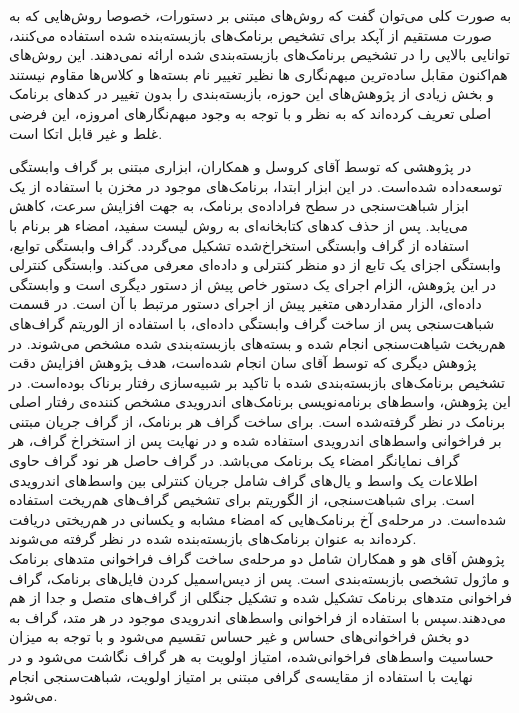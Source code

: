 به صورت کلی می‌توان گفت که روش‌های مبتنی بر دستورات، خصوصا روش‌هایی که به صورت مستقیم از آپکد برای تشخیص برنامک‌های بازبسته‌بنده شده استفاده می‌کنند، توانایی بالایی را در تشخیص برنامک‌های بازبسته‌بندی شده ارائه‌ نمی‌دهند. این روش‌های هم‌اکنون مقابل ساده‌ترین مبهم‌نگاری ها نظیر تغییر نام بسته‌ها و کلاس‌ها مقاوم نیستند و بخش زیادی از پژوهش‌های این حوزه، بازبسته‌بندی را بدون تغییر در کد‌های برنامک اصلی تعریف کرده‌اند که به نظر و با توجه به وجود مبهم‌نگارهای امروزه، این فرضی غلط و غیر قابل اتکا است.

در پژوهشی که توسط آقای کروسل و همکاران، ابزاری مبتنی بر گراف وابستگی توسعه‌داده‌ شده‌است. در این ابزار ابتدا، برنامک‌های موجود در مخزن با استفاده از یک ابزار شباهت‌سنجی در سطح فراداده‌ی برنامک، به جهت افزایش سرعت، کاهش می‌یابد. پس از حذف کد‌های کتابخانه‌ای به روش لیست سفید، امضاء هر برنام با استفاده از گراف وابستگی استخراخ‌شده تشکیل می‌گردد. گراف وابستگی توابع، وابستگی اجزای یک تابع از دو منظر کنترلی و داده‌ای معرفی می‌کند. وابستگی کنترلی در این پژوهش، الزام اجرای یک دستور خاص پیش از دستور دیگری است و وابستگی داده‌ای، الزار مقداردهی متغیر پیش از اجرای دستور مرتبط با آن است. در قسمت شباهت‌سنجی پس از ساخت گراف وابستگی داده‌ای، با استفاده از الوریتم گراف‌های هم‌ریخت  شیاهت‌سنجی انجام شده و بسته‌های بازبسته‌بندی شده مشخص می‌شوند. در پژوهش دیگری که توسط آقای سان انجام‌ شده‌است، هدف پژوهش افزایش دقت تشخیص برنامک‌های بازبسته‌بندی شده با تاکید بر شبیه‌سازی رفتار برناک بوده‌است. در این پژوهش، واسط‌های برنامه‌نویسی برنامک‌های اندرویدی مشخص کننده‌ی رفتار اصلی برنامک در نظر گرفته‌شده است. برای ساخت گراف هر برنامک، از گراف جریان مبتنی بر فراخوانی واسط‌های اندرویدی استفاده شده و در نهایت پس از استخراخ گراف، هر گراف نمایانگر امضاء یک برنامک می‌باشد. در گراف حاصل هر نود گراف حاوی اطلاعات یک واسط و یال‌های گراف شامل جریان کنترلی بین واسط‌های اندرویدی است. برای شباهت‌سنجی، از الگوریتم  برای تشخیص گراف‌های هم‌ریخت استفاده شده‌است. در مرحله‌ی آخ برنامک‌هایی که امضا‌ء مشابه و یکسانی در هم‌ریختی دریافت کرده‌اند به عنوان برنامک‌های بازبسته‌بنده شده در نظر گرفته می‌شوند.\\
پژوهش آقای هو و همکاران شامل دو مرحله‌ی ساخت گراف فراخوانی متد‌های برنامک و ماژول تشخصی بازبسته‌بندی است. پس از دیس‌اسمیل کردن فایل‌های برنامک، گراف فراخوانی متد‌های برنامک تشکیل شده و تشکیل جنگلی از گراف‌های متصل و جدا از هم می‌دهند.سپس با استفاده از فراخوانی‌ واسط‌های اندرویدی موجود در هر متد، گراف به دو بخش فراخوانی‌های حساس و غیر حساس تقسیم می‌شود و با توجه به میزان حساسیت واسط‌های فراخوانی‌شده، امتیاز اولویت به هر گراف نگاشت می‌شود و در نهایت با استفاده از مقایسه‌ی گرافی مبتنی بر امتیاز اولویت، شباهت‌سنجی انجام می‌شود.\\

